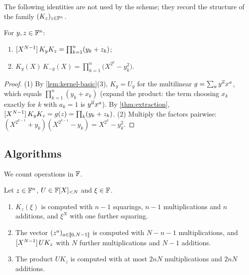 The following identities are not used by the scheme; they record the structure of the family $(K_z)_{z \in \mathbb{F}^n}$.

\begin{proposition}\label{prop:bilinear}
For $y, z \in \mathbb{F}^n$:
\begin{enumerate}
  \item $[X^{N-1}]\,K_y K_z = \prod_{k=1}^{n} (y_k + z_k)$;
  \item $K_y(X)\, K_{-y}(X) = \prod_{k=1}^{n} \bigl(X^{2^k} - y_k^2\bigr)$.
\end{enumerate}
\end{proposition}

\begin{proof}
(1) By \cref{lem:kernel-basic}(3), $K_y = U_g$ for the multilinear $g = \sum_a y^{\overline{a}} x^a$, which equals $\prod_{k=1}^n (y_k + x_k)$ (expand the product: the term choosing $x_k$ exactly for $k$ with $a_k = 1$ is $y^{\overline{a}} x^a$). By \cref{thm:extraction}, $[X^{N-1}]\,K_y K_z = g(z) = \prod_k (y_k + z_k)$.
(2) Multiply the factors pairwise: $(X^{2^{k-1}} + y_k)(X^{2^{k-1}} - y_k) = X^{2^k} - y_k^2$.
\end{proof}

\subsection{Algorithms}\label{sec:kernel:algo}

We count operations in $\mathbb{F}$.

\begin{lemma}[Costs]\label{lem:cost}
Let $z \in \mathbb{F}^n$, $U \in \mathbb{F}[X]_{<N}$ and $\xi \in \mathbb{F}$.
\begin{enumerate}
  \item $K_z(\xi)$ is computed with $n-1$ squarings, $n-1$ multiplications and $n$ additions, and $\xi^N$ with one further squaring.
  \item The vector $(z^a)_{a \in \llbracket 0, N-1 \rrbracket}$ is computed with $N - n - 1$ multiplications, and $[X^{N-1}]\,U K_z$ with $N$ further multiplications and $N-1$ additions.
  \item The product $U K_z$ is computed with at most $2nN$ multiplications and $2nN$ additions.
\end{enumerate}
\end{lemma}

